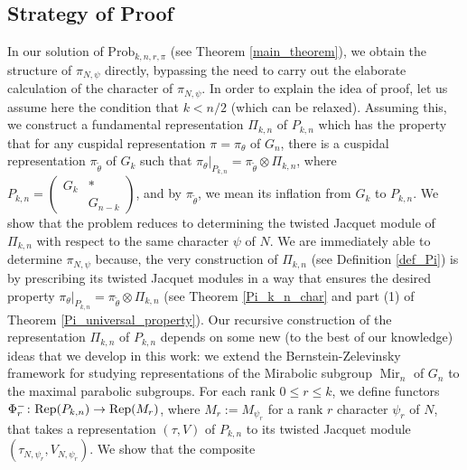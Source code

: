 \documentclass[reqno]{amsart}
\theoremstyle{definition}
\theoremstyle{remark}
\numberwithin{equation}{section}
\DeclareMathOperator{\GL}{GL}
\DeclareMathOperator{\GSp}{GSp}
\DeclareMathOperator{\Mir}{Mir}
\newcommand{\bbsm}{\left (\begin{smallmatrix}}      \newcommand{\besm}{\end{smallmatrix}\right )}
\begin{document}

\subsection{Strategy of Proof} 
In our solution of $\text{Prob}_{k,n,r,\pi}$ (see Theorem \ref{main_theorem}), we obtain the structure of $\pi_{N, \psi}$ directly, bypassing the need to  carry out the elaborate calculation of  the character of $\pi_{N, \psi}$. In order to explain the idea of proof, let us assume here the condition that $k < n/2$ (which can be relaxed). Assuming this, we construct a fundamental representation $\Pi_{k,n}$ of $P_{k,n}$ which has the property that for any cuspidal representation $\pi=\pi_\theta$ of $G_n$, there is a cuspidal representation $\pi_{\tilde\theta}$ of $G_k$  such that $\pi_\theta|_{P_{k,n}} = \pi_{\tilde\theta} \otimes \Pi_{k,n}$, where $P_{k,n} = \bbsm G_k & \ast\\& G_{n-k} \besm$, and  by $\pi_{\tilde\theta}$, we mean its inflation from $G_k$ to 
$P_{k,n}$. We show that the  problem  reduces to determining the twisted Jacquet module of $\Pi_{k,n}$ with respect to the same character $\psi$ of $N$. We are immediately able to determine $\pi_{N, \psi}$ because,  the very  construction of  $\Pi_{k,n}$ (see Definition \ref{def_Pi}) is by prescribing its twisted Jacquet modules in a way that ensures the desired property $\pi_\theta|_{P_{k,n}} = \pi_{\tilde\theta} \otimes \Pi_{k,n}$ (see Theorem \ref{Pi_k_n_char} and part (1) of Theorem \ref{Pi_universal_property}). Our recursive construction of the representation $\Pi_{k,n}$ of $P_{k,n}$ depends on some new (to the best of our knowledge) ideas that we develop in this work: we extend the Bernstein-Zelevinsky framework for studying representations of the Mirabolic subgroup $\Mir_n$ of $G_n$ to the maximal parabolic subgroups. For each rank $0 \leq r \leq k$,  we define functors $\Phi_r^- \colon {\rm Rep}(P_{k,n}) \to  {\rm Rep}(M_r)$,  where $M_r:=M_{\psi_r}$ for a rank $r$ character $\psi_r$ of $N$, that takes a representation $(\tau,V)$ of $P_{k,n}$ to its twisted Jacquet module $(\tau_{N,\psi_r}, V_{N,\psi_r})$. We show that the composite 
\end{document}
